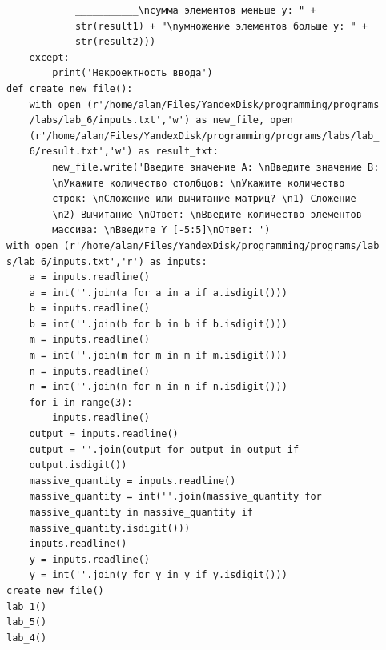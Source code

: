 \documentclass[a4paper]{article}
\begin{document}
\begin{lab1}
\begin{verbatim}
            ___________\nсумма элементов меньше y: " + 
            str(result1) + "\nумножение элементов больше y: " + 
            str(result2)))
    except:
        print('Некроектность ввода')
def create_new_file():
    with open (r'/home/alan/Files/YandexDisk/programming/programs
    /labs/lab_6/inputs.txt','w') as new_file, open 
    (r'/home/alan/Files/YandexDisk/programming/programs/labs/lab_
    6/result.txt','w') as result_txt:
        new_file.write('Введите значение А: \nВведите значение В:
        \nУкажите количество столбцов: \nУкажите количество 
        строк: \nСложение или вычитание матриц? \n1) Сложение 
        \n2) Вычитание \nОтвет: \nВведите количество элементов 
        массива: \nВведите Y [-5:5]\nОтвет: ')
with open (r'/home/alan/Files/YandexDisk/programming/programs/lab
s/lab_6/inputs.txt','r') as inputs:
    a = inputs.readline()
    a = int(''.join(a for a in a if a.isdigit()))
    b = inputs.readline()
    b = int(''.join(b for b in b if b.isdigit()))
    m = inputs.readline()
    m = int(''.join(m for m in m if m.isdigit()))
    n = inputs.readline()
    n = int(''.join(n for n in n if n.isdigit()))
    for i in range(3):
        inputs.readline()
    output = inputs.readline()
    output = ''.join(output for output in output if 
    output.isdigit())
    massive_quantity = inputs.readline()
    massive_quantity = int(''.join(massive_quantity for 
    massive_quantity in massive_quantity if 
    massive_quantity.isdigit()))
    inputs.readline()
    y = inputs.readline()
    y = int(''.join(y for y in y if y.isdigit()))
create_new_file()
lab_1()
lab_5()
lab_4()

    \end{verbatim}
    \end{lab1}
    
\end{document}
